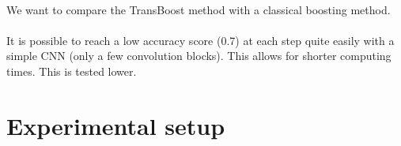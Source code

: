 \documentclass[11 pt]{article}
\begin{document}
\paragraph{}We want to compare the TransBoost method with a classical boosting method. 

\paragraph{}It is possible to reach a low accuracy score (0.7) at each step quite easily with a simple CNN (only a few convolution blocks). This allows for shorter computing times. This is tested lower.

\section{Experimental setup}
\end{document}
